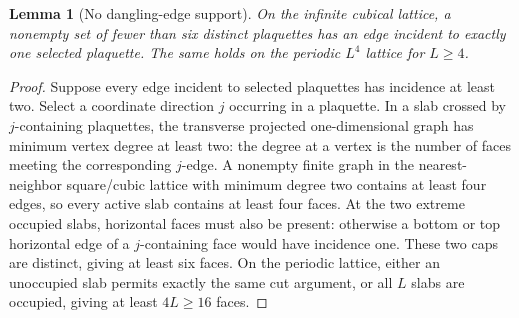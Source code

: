 \documentclass[11pt,a4paper]{article}
\newtheorem{lemma}{Lemma}
\begin{document}
\begin{lemma}[No dangling-edge support]\label{lem:nofree}
On the infinite cubical lattice, a nonempty set of fewer than six
distinct plaquettes has an edge incident to exactly one selected
plaquette. The same holds on the periodic $L^4$ lattice for $L\ge4$.
\end{lemma}
\begin{proof}
Suppose every edge incident to selected plaquettes has incidence at
least two. Select a coordinate direction $j$ occurring in a plaquette.
In a slab crossed by $j$-containing plaquettes, the transverse
projected one-dimensional graph has minimum vertex degree at least
two: the degree at a vertex is the number of faces meeting the
corresponding $j$-edge. A nonempty finite graph in the
nearest-neighbor square/cubic lattice with minimum degree two
contains at least four edges, so every active slab contains at least
four faces. At the two extreme occupied slabs, horizontal faces must
also be present: otherwise a bottom or top horizontal edge of a
$j$-containing face would have incidence one. These two caps are
distinct, giving at least six faces. On the periodic lattice, either
an unoccupied slab permits exactly the same cut argument, or all $L$
slabs are occupied, giving at least $4L\ge16$ faces.
\end{proof}
\end{document}
